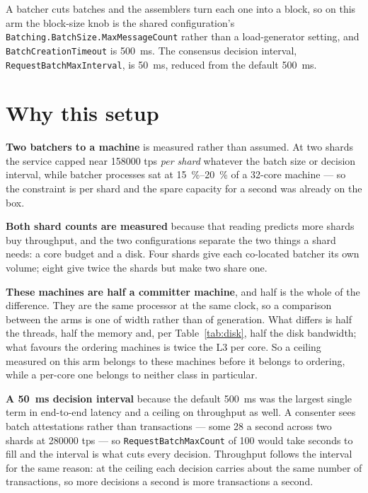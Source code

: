 \documentclass[10pt,twocolumn]{article}
\begin{document}
A batcher cuts batches and the assemblers turn each one into a block, so on this arm the block-size
knob is the shared configuration's \texttt{Batching.BatchSize.MaxMessageCount} rather than a
load-generator setting, and \texttt{BatchCreationTimeout} is \SI{500}{\milli\second}. The
consensus decision interval, \texttt{RequestBatchMaxInterval}, is \SI{50}{\milli\second}, reduced
from the default \SI{500}{\milli\second}.

\section{Why this setup}

\textbf{Two batchers to a machine} is measured rather than assumed. At two shards the service capped
near \num{158000} tps \emph{per shard} whatever the batch size or decision interval, while batcher
processes sat at \SIrange{15}{20}{\percent} of a 32-core machine --- so the constraint is per shard and
the spare capacity for a second was already on the box.

\textbf{Both shard counts are measured} because that reading predicts more shards buy throughput, and
the two configurations separate the two things a shard needs: a core budget and a disk. Four shards
give each co-located batcher its own volume; eight give twice the shards but make two share one.

\textbf{These machines are half a committer machine}, and half is the whole of the difference. They are
the same processor at the same clock, so a comparison between the arms is one of width rather than of
generation. What differs is half the threads, half the memory and, per Table~\ref{tab:disk}, half the
disk bandwidth; what favours the ordering machines is twice the L3 per core. So a ceiling measured on this arm belongs to these machines before it belongs to
ordering, while a per-core one belongs to neither class in particular.

\textbf{A \SI{50}{\milli\second} decision interval} because the default \SI{500}{\milli\second} was
the largest single term in end-to-end latency and a ceiling on throughput as well. A consenter sees
batch attestations rather than transactions --- some 28 a second across two shards at \num{280000} tps
--- so \texttt{RequestBatchMaxCount} of 100 would take seconds to fill and the interval is what cuts
every decision. Throughput follows the interval for the same reason: at the ceiling each decision
carries about the same number of transactions, so more decisions a second is more transactions a
second.
\end{document}
